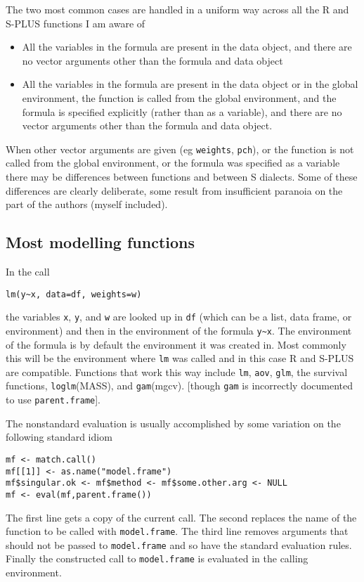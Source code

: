 \documentclass[11pt]{article}
\begin{document}
The two most common cases are handled in a uniform way across all the
R and S-PLUS functions I am aware of
\begin{itemize}
\item All the variables in the formula are present in the data object, and there are no vector arguments other than the formula and data object
\item All the variables in the formula are present in the data object or in the global environment, the function is called from the global environment, and the formula is specified explicitly (rather than as a variable), and there are no vector arguments other than the formula and data object.
\end{itemize}

When other vector arguments are given (eg \texttt{weights}, \texttt{pch}), or the function is not called from the global environment, or the formula was specified as a variable there may be differences between functions and between S dialects. Some of these differences are clearly deliberate, some result from insufficient paranoia on the part of the authors (myself included).

\subsection{Most modelling functions}
In the call
\begin{verbatim}
lm(y~x, data=df, weights=w)
\end{verbatim}
the variables \verb=x=, \verb=y=, and \verb=w= are looked up in \verb=df= (which can be a list, data frame, or environment) and then in the environment of the formula \verb=y~x=.  The environment of the formula is by default the environment it was created in.  Most commonly this will be the environment where \verb=lm= was called and in this case R and S-PLUS are compatible. Functions that work this way include \texttt{lm}, \texttt{aov}, \texttt{glm}, the survival functions, \texttt{loglm}(MASS), and \texttt{gam}(mgcv). [though \texttt{gam} is incorrectly documented to use \texttt{parent.frame}]. 

The nonstandard evaluation is usually accomplished by some variation on the following standard idiom
\begin{verbatim}
mf <- match.call()
mf[[1]] <- as.name("model.frame")
mf$singular.ok <- mf$method <- mf$some.other.arg <- NULL
mf <- eval(mf,parent.frame())
\end{verbatim}
 
The first line gets a copy of the current call. The second replaces the name of the function to be called with \texttt{model.frame}. The third line removes arguments that should not be passed to \texttt{model.frame} and so have the standard evaluation rules.  Finally the constructed call to \texttt{model.frame} is evaluated in the calling environment.
\end{document}
